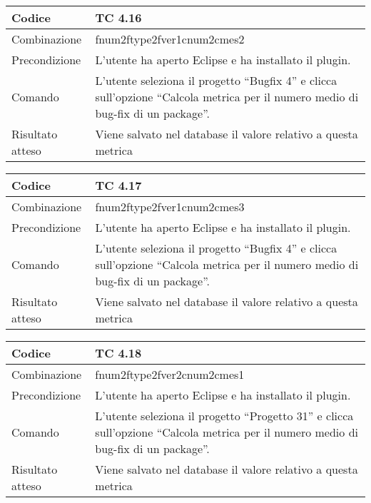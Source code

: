 \begin{table}[ht]
\begin{tabular}{|p{3cm}|p{9cm}|}
\hline
\cellcolor{lightgray}Codice				& TC 4.16								\\
\hline
\cellcolor{lightgray}Combinazione		& fnum2ftype2fver1cnum2cmes2								\\
\hline
\cellcolor{lightgray}Precondizione		& L'utente ha aperto Eclipse e ha installato il plugin.				\\
\hline
\cellcolor{lightgray}Comando			& L'utente seleziona il progetto ``Bugfix 4''  e clicca sull'opzione ``Calcola metrica per il numero medio di bug-fix di un package''.	\\
\hline
\cellcolor{lightgray}Risultato atteso	& Viene salvato nel database il valore relativo a questa metrica	\\
\hline
\end{tabular}
\end{table}

\begin{table}[ht]
\begin{tabular}{|p{3cm}|p{9cm}|}
\hline
\cellcolor{lightgray}Codice				& TC 4.17								\\
\hline
\cellcolor{lightgray}Combinazione		& fnum2ftype2fver1cnum2cmes3							\\
\hline
\cellcolor{lightgray}Precondizione		& L'utente ha aperto Eclipse e ha installato il plugin.									\\
\hline
\cellcolor{lightgray}Comando			& L'utente seleziona il progetto ``Bugfix 4''  e clicca sull'opzione ``Calcola metrica per il numero medio di bug-fix di un package''.	\\
\hline
\cellcolor{lightgray}Risultato atteso	& Viene salvato nel database il valore relativo a questa metrica	\\
\hline
\end{tabular}
\end{table}

\begin{table}[ht]
\begin{tabular}{|p{3cm}|p{9cm}|}
\hline
\cellcolor{lightgray}Codice				& TC 4.18								\\
\hline
\cellcolor{lightgray}Combinazione		& fnum2ftype2fver2cnum2cmes1 									\\
\hline
\cellcolor{lightgray}Precondizione		& L'utente ha aperto Eclipse e ha installato il plugin.				\\
\hline
\cellcolor{lightgray}Comando			& L'utente seleziona il progetto ``Progetto 31''  e clicca sull'opzione ``Calcola metrica per il numero medio di bug-fix di un package''.	\\
\hline
\cellcolor{lightgray}Risultato atteso	& Viene salvato nel database il valore relativo a questa metrica	\\
\hline
\end{tabular}
\end{table}

